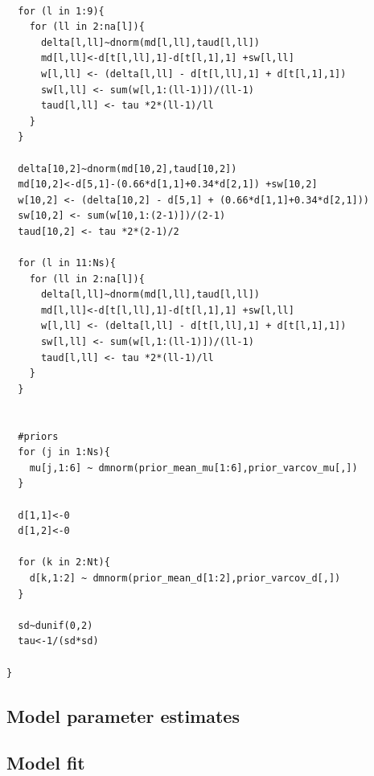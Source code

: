 \documentclass[11pt,final,fleqn]{article}\usepackage[]{graphicx}\usepackage[]{color}
\theoremstyle{plain}
\begin{document}
\begin{appendices}
\begin{verbatim}
  
  for (l in 1:9){
    for (ll in 2:na[l]){
      delta[l,ll]~dnorm(md[l,ll],taud[l,ll])
      md[l,ll]<-d[t[l,ll],1]-d[t[l,1],1] +sw[l,ll]
      w[l,ll] <- (delta[l,ll] - d[t[l,ll],1] + d[t[l,1],1])
      sw[l,ll] <- sum(w[l,1:(ll-1)])/(ll-1) 
      taud[l,ll] <- tau *2*(ll-1)/ll 
    }
  }
  
  delta[10,2]~dnorm(md[10,2],taud[10,2])
  md[10,2]<-d[5,1]-(0.66*d[1,1]+0.34*d[2,1]) +sw[10,2]
  w[10,2] <- (delta[10,2] - d[5,1] + (0.66*d[1,1]+0.34*d[2,1]))
  sw[10,2] <- sum(w[10,1:(2-1)])/(2-1) 
  taud[10,2] <- tau *2*(2-1)/2 
  
  for (l in 11:Ns){
    for (ll in 2:na[l]){
      delta[l,ll]~dnorm(md[l,ll],taud[l,ll])
      md[l,ll]<-d[t[l,ll],1]-d[t[l,1],1] +sw[l,ll]
      w[l,ll] <- (delta[l,ll] - d[t[l,ll],1] + d[t[l,1],1])
      sw[l,ll] <- sum(w[l,1:(ll-1)])/(ll-1) 
      taud[l,ll] <- tau *2*(ll-1)/ll 
    }
  }
  
  
  #priors
  for (j in 1:Ns){
    mu[j,1:6] ~ dmnorm(prior_mean_mu[1:6],prior_varcov_mu[,]) 
  }
  
  d[1,1]<-0
  d[1,2]<-0

  for (k in 2:Nt){
    d[k,1:2] ~ dmnorm(prior_mean_d[1:2],prior_varcov_d[,]) 
  }
  
  sd~dunif(0,2)
  tau<-1/(sd*sd)
  
}

\end{verbatim}


\subsection{Model parameter estimates}

\subsection{Model fit}\label{app:DIC-nma-1l}


\end{appendices}
\end{document}

